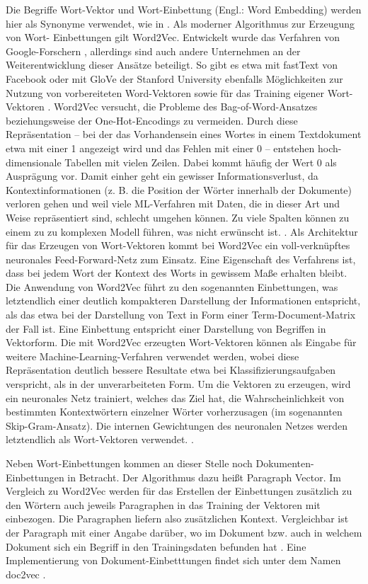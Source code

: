 Die Begriffe Wort-Vektor und Wort-Einbettung (Engl.: Word Embedding) werden hier als Synonyme verwendet, wie in \cite[S. 38]{White}. Als moderner Algorithmus zur Erzeugung von Wort- Einbettungen gilt Word2Vec. Entwickelt wurde das Verfahren von Google-Forschern \cite{mikolov2013}, allerdings sind auch andere Unternehmen an der Weiterentwicklung dieser Ansätze beteiligt. So gibt es etwa mit fastText von Facebook oder mit GloVe der Stanford University ebenfalls Möglichkeiten zur Nutzung von vorbereiteten Word-Vektoren sowie für das Training eigener Wort-Vektoren \cite{facebook} \cite{stanford}. Word2Vec versucht, die Probleme des Bag-of-Word-Ansatzes beziehungsweise der One-Hot-Encodings zu vermeiden. Durch diese Repräsentation – bei der das Vorhandensein eines Wortes in einem Textdokument etwa mit einer 1 angezeigt wird und das Fehlen mit einer 0 – entstehen hoch-dimensionale Tabellen mit vielen Zeilen. Dabei kommt häufig der Wert 0 als Ausprägung vor. Damit einher geht ein gewisser Informationsverlust, da Kontextinformationen (z. B. die Position der Wörter innerhalb der Dokumente) verloren gehen  und weil viele ML-Verfahren mit Daten, die in dieser Art und Weise repräsentiert sind, schlecht umgehen können. Zu viele Spalten können zu einem zu zu komplexen Modell führen, was nicht erwünscht ist. \cite[S. 145]{knime}. Als Architektur für das Erzeugen von Wort-Vektoren kommt bei Word2Vec ein voll-verknüpftes neuronales Feed-Forward-Netz zum Einsatz. Eine Eigenschaft des Verfahrens ist, dass bei jedem Wort der Kontext des Worts in gewissem Maße erhalten bleibt. Die Anwendung von Word2Vec führt zu den sogenannten Einbettungen, was letztendlich einer deutlich kompakteren Darstellung der Informationen entspricht, als das etwa bei der Darstellung von Text in Form einer Term-Document-Matrix der Fall ist. Eine Einbettung entspricht einer Darstellung von Begriffen in Vektorform. Die mit Word2Vec erzeugten Wort-Vektoren können als Eingabe für weitere Machine-Learning-Verfahren verwendet werden, wobei diese Repräsentation deutlich bessere Resultate etwa bei Klassifizierungsaufgaben verspricht, als in der unverarbeiteten Form. Um die Vektoren zu erzeugen, wird ein neuronales Netz trainiert, welches das Ziel hat, die Wahrscheinlichkeit von bestimmten Kontextwörtern einzelner Wörter vorherzusagen (im sogenannten Skip-Gram-Ansatz). Die internen Gewichtungen des neuronalen Netzes werden letztendlich als Wort-Vektoren verwendet. \cite[S. 148-160]{knime}. 

Neben Wort-Einbettungen kommen an dieser Stelle noch Dokumenten-Einbettungen in Betracht. Der Algorithmus dazu heißt Paragraph Vector. Im Vergleich zu Word2Vec werden für das Erstellen der Einbettungen zusätzlich zu den Wörtern auch jeweils Paragraphen in das Training der Vektoren mit einbezogen. Die Paragraphen liefern also zusätzlichen Kontext. Vergleichbar ist der Paragraph mit einer Angabe darüber, wo im Dokument bzw. auch in welchem Dokument sich ein Begriff in den Trainingsdaten befunden hat \cite{mikolov2014}. Eine Implementierung von Dokument-Einbetttungen findet sich unter dem Namen doc2vec \cite{rehurek}.

